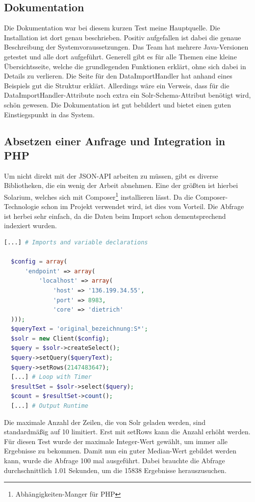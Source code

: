 \subsection{Dokumentation}

Die Dokumentation war bei diesem kurzen Test meine Hauptquelle. Die Installation ist dort genau beschrieben. Positiv aufgefallen ist dabei die genaue Beschreibung der Systemvoraussetzungen. Das Team hat mehrere Java-Versionen getestet und alle dort aufgeführt. 
Generell gibt es für alle Themen eine kleine Übersichtsseite, welche die grundlegenden Funktionen erklärt, ohne sich dabei in Details zu verlieren. 
Die Seite für den DataImportHandler hat anhand eines Beispiels gut die Struktur erklärt. Allerdings wäre ein Verweis, dass für die DataImportHandler-Attribute noch extra ein Solr-Schema-Attribut benötigt wird, schön gewesen.
Die Dokumentation ist gut bebildert und bietet einen guten Einstiegspunkt in das System.

\subsection{Absetzen einer Anfrage und Integration in PHP}

Um nicht direkt mit der JSON-API arbeiten zu müssen, gibt es diverse Bibliotheken, die ein wenig der Arbeit abnehmen. Eine der größten ist hierbei Solarium, welches sich mit Composer\footnote{Abhängigkeiten-Manger für PHP} installieren lässt. Da die Composer-Technologie schon im Projekt verwendet wird, ist dies vom Vorteil.
Die Abfrage ist herbei sehr einfach, da die Daten beim Import schon dementsprechend indexiert wurden.

\begin{lstlisting}[language=php, frame=single, label={lst:SolrPhp}, 
  morekeywords={type,uninvertible,indexed,stored,field,multiValued, name}, caption=Auschnitt auf dem PHP-Code zur Abfrage,captionpos=b] 
  [...] # Imports and variable declarations

  $config = array(
      'endpoint' => array(
          'localhost' => array(
              'host' => '136.199.34.55',
              'port' => 8983,
              'core' => 'dietrich'
  )));
  $queryText = 'original_bezeichnung:S*';
  $solr = new Client($config);
  $query = $solr->createSelect();
  $query->setQuery($queryText);
  $query->setRows(2147483647); 
  [...] # Loop with Timer
  $resultSet = $solr->select($query);
  $count = $resultSet->count();
  [...] # Output Runtime
\end{lstlisting}

Die maximale Anzahl der Zeilen, die von Solr geladen werden, sind standardmäßig auf 10 limitiert. Erst mit setRows kann die Anzahl erhöht werden. Für diesen Test wurde der maximale Integer-Wert gewählt, um immer alle Ergebnisse zu bekommen. Damit nun ein guter Median-Wert gebildet werden kann, wurde die Abfrage 100 mal ausgeführt. Dabei brauchte die Abfrage durchschnittlich 1.01 Sekunden, um die 15838 Ergebnisse herauszusuchen. 

